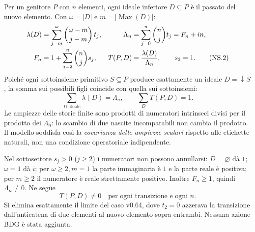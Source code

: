 \documentclass[11pt,a4paper]{article}
\begin{document}
Per un genitore $P$ con $n$ elementi, ogni ideale inferiore $D\subseteq P$ \`e il passato del nuovo elemento. Con $\omega=|D|$ e $m=|\operatorname{Max}(D)|$:
\begin{align}
\lambda(D)&=\sum_{j=m}^{\omega}\binom{\omega-m}{j-m}\,t_j,
&\Lambda_n&=\sum_{j=0}^n\binom nj t_j=F_n+in,\notag\\[-1pt]
F_n&=1+\sum_{j=2}^{n}\binom nj s_j,
&T(P,D)&=\frac{\lambda(D)}{\Lambda_n},\qquad s_3=1.\tag{NS.2}
\end{align}
Poich\'e ogni sottoinsieme primitivo $S\subseteq P$ produce esattamente un ideale $D=\downarrow S$, la somma sui possibili figli coincide con quella sui sottoinsiemi:
\begin{equation}
\boxed{\sum_{D\ \mathrm{ideale}}\lambda(D)=\Lambda_n,\qquad \sum_D T(P,D)=1.}\tag{NS.3}
\end{equation}
Le ampiezze delle storie finite sono prodotti di numeratori intrinseci divisi per il prodotto dei $\Lambda_n$: lo scambio di due nascite incomparabili non cambia il prodotto. Il modello soddisfa cos\`i la \emph{covarianza delle ampiezze scalari} rispetto alle etichette naturali, non una condizione operatoriale indipendente.

Nel sottosettore $s_j>0$ ($j\ge2$) i numeratori non possono annullarsi: $D=\varnothing$ d\`a $1$; $\omega=1$ d\`a $i$; per $\omega\ge2,m=1$ la parte immaginaria \`e $1$ e la parte reale \`e positiva; per $m\ge2$ il numeratore \`e reale strettamente positivo. Inoltre $F_n\ge1$, quindi $\Lambda_n\neq0$. Ne segue
\begin{equation}
\boxed{T(P,D)\neq0\quad\text{per ogni transizione e ogni }n.}\tag{NS.4}
\end{equation}
Si elimina esattamente il limite del caso v0.64, dove $t_2=0$ azzerava la transizione dall'anticatena di due elementi al nuovo elemento sopra entrambi. Nessuna azione BDG \`e stata aggiunta.

\clearpage
\end{document}
